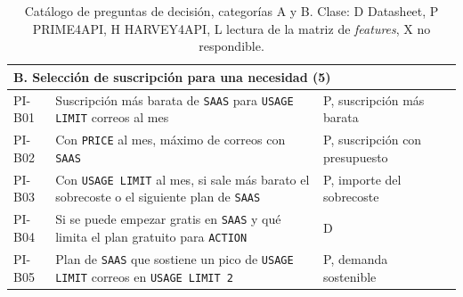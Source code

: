 \begin{table}[htbp]
\begin{tabular}{|l|>{\raggedright\arraybackslash}p{6.6cm}|>{\raggedright\arraybackslash}p{2.2cm}|>{\raggedright\arraybackslash}p{3.4cm}|}
\hline
\multicolumn{4}{|l|}{\textbf{B. Selección de suscripción para una necesidad (5)}} \\
\hline
PI-B01 & Suscripción más barata de \texttt{SAAS} para \texttt{USAGE LIMIT} correos al mes & P, suscripción más barata & \\
PI-B02 & Con \texttt{PRICE} al mes, máximo de correos con \texttt{SAAS} & P, suscripción con presupuesto & \\
PI-B03 & Con \texttt{USAGE LIMIT} al mes, si sale más barato el sobrecoste o el siguiente plan de \texttt{SAAS} & P, importe del sobrecoste & \\
PI-B04 & Si se puede empezar gratis en \texttt{SAAS} y qué limita el plan gratuito para \texttt{ACTION} & D & \\
PI-B05 & Plan de \texttt{SAAS} que sostiene un pico de \texttt{USAGE LIMIT} correos en \texttt{USAGE LIMIT 2} & P, demanda sostenible & \\
\hline
\end{tabular}
\caption[Catálogo de preguntas de decisión, categorías A y B]{Catálogo de preguntas de decisión, categorías A y B. Clase: D
Datasheet, P PRIME4API, H HARVEY4API, L lectura de la matriz de \textit{features}, X no respondible.}
\label{tab:catalogo-pi-1}
\end{table}


